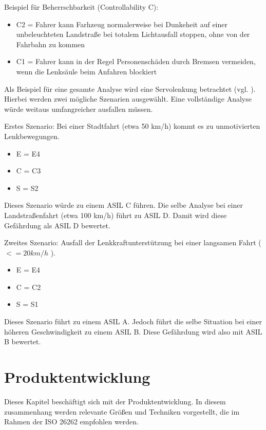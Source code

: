 \documentclass[a4paper,DIV=calc,ngerman]{scrartcl}
\begin{document}
Beispiel für Beherrschbarkeit (Controllability C):
\begin{itemize}
    \item C2 = Fahrer kann Farhzeug normalerweise bei Dunkeheit auf einer unbeleuchteten Landstraße bei totalem Lichtausfall stoppen, ohne von der Fahrbahn zu kommen
    \item C1 = Fahrer kann in der Regel Personenschäden durch Bremsen vermeiden, wenn die Lenksäule beim Anfahren blockiert
\end{itemize}

Als Beispiel für eine gesamte Analyse wird eine Servolenkung betrachtet (vgl. \cite[S. 217]{1}). Hierbei werden zwei mögliche Szenarien ausgewählt. Eine vollständige Analyse würde weitaus umfangreicher ausfallen müssen.

Erstes Szenario: Bei einer Stadtfahrt (etwa 50 km/h) kommt es zu unmotivierten Lenkbewegungen.
\begin{itemize}
    \item E = E4
    \item C = C3
    \item S = S2
\end{itemize}

Dieses Szenario würde zu einem ASIL C führen. Die selbe Analyse bei einer Landstraßenfahrt (etwa 100 km/h) führt zu ASIL D. Damit wird diese Gefährdung als ASIL D bewertet.

Zweites Szenario: Ausfall der Lenkkraftunterstützung bei einer langsamen Fahrt ( $ <= 20 km/h $ ).

\begin{itemize}
    \item E = E4
    \item C = C2
    \item S = S1
\end{itemize}

Dieses Szenario führt zu einem ASIL A. Jedoch führt die selbe Situation bei einer höheren Geschwindigkeit zu einem ASIL B. Diese Gefährdung wird also mit ASIL B bewertet.



\section{Produktentwicklung}
\label{sec:Produktentwicklung}
Dieses Kapitel beschäftigt sich mit der Produktentwicklung. In diesem zusammenhang werden relevante Größen und Techniken vorgestellt, die im Rahmen der ISO 26262 empfohlen werden. 
\end{document}

